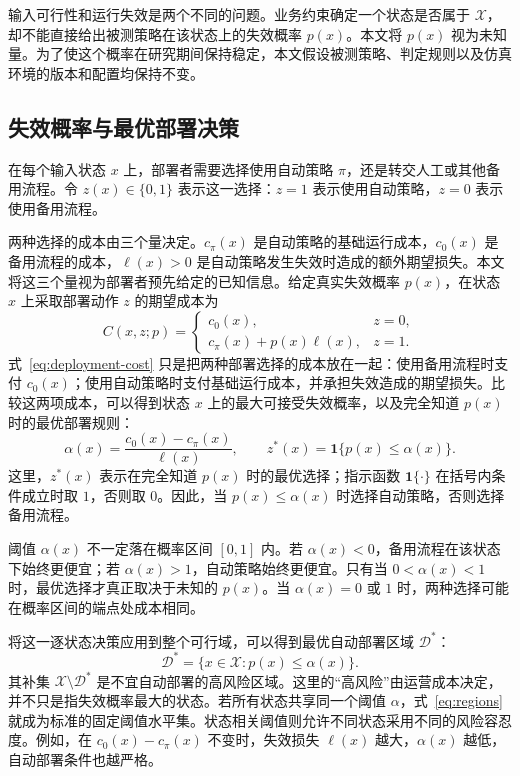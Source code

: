 \documentclass[UTF8,11pt,a4paper,fontset=none]{ctexart}
\newcommand{\X}{\mathcal X}
\newcommand{\D}{\mathcal D}
\newcommand{\1}{\mathbf 1}
\begin{document}
输入可行性和运行失效是两个不同的问题。业务约束确定一个状态是否属于 $\X$，却不能直接给出被测策略在该状态上的失效概率 $p(x)$。本文将 $p(x)$ 视为未知量。为了使这个概率在研究期间保持稳定，本文假设被测策略、判定规则以及仿真环境的版本和配置均保持不变。

\subsection{失效概率与最优部署决策}

在每个输入状态 $x$ 上，部署者需要选择使用自动策略 $\pi$，还是转交人工或其他备用流程。令 $z(x)\in\{0,1\}$ 表示这一选择：$z=1$ 表示使用自动策略，$z=0$ 表示使用备用流程。

两种选择的成本由三个量决定。$c_\pi(x)$ 是自动策略的基础运行成本，$c_0(x)$ 是备用流程的成本，$\ell(x)>0$ 是自动策略发生失效时造成的额外期望损失。本文将这三个量视为部署者预先给定的已知信息。给定真实失效概率 $p(x)$，在状态 $x$ 上采取部署动作 $z$ 的期望成本为
\begin{equation}
  C(x,z;p)=
  \begin{cases}
    c_0(x), & z=0,\\
    c_\pi(x)+p(x)\ell(x), & z=1.
  \end{cases}
  \label{eq:deployment-cost}
\end{equation}
式~\eqref{eq:deployment-cost} 只是把两种部署选择的成本放在一起：使用备用流程时支付 $c_0(x)$；使用自动策略时支付基础运行成本，并承担失效造成的期望损失。比较这两项成本，可以得到状态 $x$ 上的最大可接受失效概率，以及完全知道 $p(x)$ 时的最优部署规则：
\begin{equation}
  \alpha(x)=\frac{c_0(x)-c_\pi(x)}{\ell(x)},
  \qquad
  z^*(x)=\1\{p(x)\leq\alpha(x)\}.
  \label{eq:optimal-deployment}
\end{equation}
这里，$z^*(x)$ 表示在完全知道 $p(x)$ 时的最优选择；指示函数 $\1\{\cdot\}$ 在括号内条件成立时取 $1$，否则取 $0$。因此，当 $p(x)\leq\alpha(x)$ 时选择自动策略，否则选择备用流程。

阈值 $\alpha(x)$ 不一定落在概率区间 $[0,1]$ 内。若 $\alpha(x)<0$，备用流程在该状态下始终更便宜；若 $\alpha(x)>1$，自动策略始终更便宜。只有当 $0<\alpha(x)<1$ 时，最优选择才真正取决于未知的 $p(x)$。当 $\alpha(x)=0$ 或 $1$ 时，两种选择可能在概率区间的端点处成本相同。

将这一逐状态决策应用到整个可行域，可以得到最优自动部署区域 $\D^*$：
\begin{equation}
  \D^*=\{x\in\X:p(x)\leq\alpha(x)\}.
  \label{eq:regions}
\end{equation}
其补集 $\X\setminus\D^*$ 是不宜自动部署的高风险区域。这里的“高风险”由运营成本决定，并不只是指失效概率最大的状态。若所有状态共享同一个阈值 $\alpha$，式~\eqref{eq:regions} 就成为标准的固定阈值水平集。状态相关阈值则允许不同状态采用不同的风险容忍度。例如，在 $c_0(x)-c_\pi(x)$ 不变时，失效损失 $\ell(x)$ 越大，$\alpha(x)$ 越低，自动部署条件也越严格。
\end{document}
